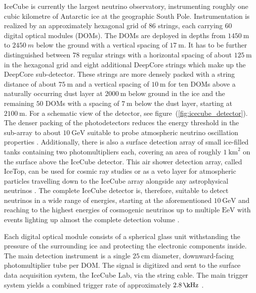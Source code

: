 IceCube is currently the largest neutrino observatory, instrumenting roughly one cubic kilometre of Antarctic ice at the geographic South Pole.
Instrumentation is realized by an approximately hexagonal grid of $\num{86}$ strings, each carrying $\num{60}$ digital optical modules (DOMs).
The DOMs are deployed in depths from $\SI{1450}{\m}$ to $\SI{2450}{m}$ below the ground with a vertical spacing of $\SI{17}{\m}$.
It has to be further distinguished between $\num{78}$ regular strings with a horizontal spacing of about $\SI{125}{\m}$ in the hexagonal grid and eight additional DeepCore strings which make up the DeepCore sub-detector.
These strings are more densely packed with a string distance of about $\SI{75}{\m}$ and a vertical spacing of $\SI{10}{\m}$ for ten DOMs above a naturally occurring dust layer at $\SI{2000}{\m}$ below ground in the ice and the remaining $\num{50}$ DOMs with a spacing of $\SI{7}{\m}$ below the dust layer, starting at $\SI{2100}{\m}$.
For a schematic view of the detector, see figure~(\ref{fig:icecube_detector}).
The denser packing of the photodetectors reduces the energy threshold in the sub-array to about $\SI{10}{\GeV}$ suitable to probe atmospheric neutrino oscillation properties .
Additionally, there is also a surface detection array of small ice-filled tanks containing two photomultipliers each, covering an area of roughly $\SI{1}{\km\squared}$ on the surface above the IceCube detector.
This air shower detection array, called IceTop, can be used for cosmic ray studies or as a veto layer for atmospheric particles travelling down to the IceCube array alongside any astrophysical neutrinos .
The complete IceCube detector is, therefore, suitable to detect neutrinos in a wide range of energies, starting at the aforementioned $\SI{10}{\GeV}$ and reaching to the highest energies of cosmogenic neutrinos up to multiple $\si{\exa\eV}$ with events lighting up almost the complete detection volume .

Each digital optical module consists of a spherical glass unit withstanding the pressure of the surrounding ice and protecting the electronic components inside.
The main detection instrument is a single $\SI{25}{\cm}$ diameter, downward-facing photomultiplier tube per DOM.
The signal is digitized and sent to the surface data acquisition system, the IceCube Lab, via the string cable.
The main trigger system yields a combined trigger rate of approximately $\SI{2.8}{\k\Hz}$ .

